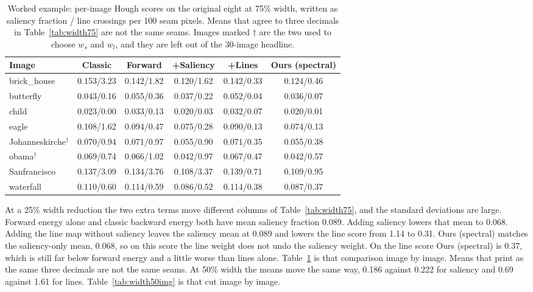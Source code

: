 \documentclass[10pt,twocolumn,letterpaper]{article}
\begin{document}
\begin{table}[t]
\centering
\caption{Worked example: per-image Hough scores on the original eight at 75\% width, written as saliency fraction / line crossings per 100 seam pixels. Means that agree to three decimals in Table~\ref{tab:width75} are not the same seams. Images marked $\dagger$ are the two used to choose $w_s$ and $w_l$, and they are left out of the 30-image headline.}
\label{tab:perimage}
\scriptsize
\begin{tabular}{lccccc}
\toprule
Image & Classic & Forward & +Saliency & +Lines & Ours (spectral) \\
\midrule
brick\_house & 0.153/3.23 & 0.142/1.82 & 0.120/1.62 & 0.142/0.33 & 0.124/0.46 \\
butterfly & 0.043/0.16 & 0.055/0.36 & 0.037/0.22 & 0.052/0.04 & 0.036/0.07 \\
child & 0.023/0.00 & 0.033/0.13 & 0.020/0.03 & 0.032/0.07 & 0.020/0.01 \\
eagle & 0.108/1.62 & 0.094/0.47 & 0.075/0.28 & 0.090/0.13 & 0.074/0.13 \\
Johanneskirche$^\dagger$ & 0.070/0.94 & 0.071/0.97 & 0.055/0.90 & 0.071/0.35 & 0.055/0.38 \\
obama$^\dagger$ & 0.069/0.74 & 0.066/1.02 & 0.042/0.97 & 0.067/0.47 & 0.042/0.57 \\
Sanfrancisco & 0.137/3.09 & 0.134/3.76 & 0.108/3.37 & 0.139/0.71 & 0.109/0.95 \\
waterfall & 0.110/0.60 & 0.114/0.59 & 0.086/0.52 & 0.114/0.38 & 0.087/0.37 \\
\bottomrule
\end{tabular}
\end{table}

At a 25\% width reduction the two extra terms move different columns of Table~\ref{tab:width75}, and the standard deviations are large.
Forward energy alone and classic backward energy both have mean saliency fraction 0.089.
Adding saliency lowers that mean to 0.068.
Adding the line map without saliency leaves the saliency mean at 0.089 and lowers the line score from 1.14 to 0.31.
Ours (spectral) matches the saliency-only mean, 0.068, so on this score the line weight does not undo the saliency weight.
On the line score Ours (spectral) is 0.37, which is still far below forward energy and a little worse than lines alone.
Table~\ref{tab:perimage} is that comparison image by image.
Means that print as the same three decimals are not the same seams.
At 50\% width the means move the same way, 0.186 against 0.222 for saliency and 0.69 against 1.61 for lines.
Table~\ref{tab:width50img} is that cut image by image.
\end{document}
